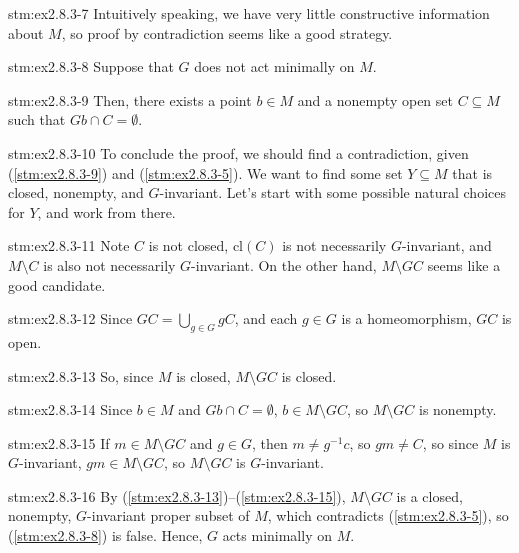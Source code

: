 \begin{explanation}{stm:ex2.8.3-7}
Intuitively speaking, we have very little constructive information about $M$, so proof by contradiction seems like a good strategy.
\end{explanation}

\begin{statement}{stm:ex2.8.3-8}
Suppose that $G$ does not act minimally on $M$.
\end{statement}

\begin{statement}{stm:ex2.8.3-9}
Then, there exists a point $b \in M$ and a nonempty open set $C \subseteq M$ such that $Gb \cap C = \emptyset$.
\end{statement}

\begin{explanation}{stm:ex2.8.3-10}
To conclude the proof, we should find a contradiction, given (\ref{stm:ex2.8.3-9}) and (\ref{stm:ex2.8.3-5}). We want to find some set $Y \subseteq M$ that is closed, nonempty, and $G$-invariant. Let's start with some possible natural choices for $Y$, and work from there.
\end{explanation}

\begin{explanation}{stm:ex2.8.3-11}
Note $C$ is not closed, $\text{cl}(C)$ is not necessarily $G$-invariant, and $M \setminus C$ is also not necessarily $G$-invariant. On the other hand, $M \setminus GC$ seems like a good candidate.
\end{explanation}

\begin{statement}{stm:ex2.8.3-12}
Since $GC = \bigcup_{g \in G} gC$, and each $g \in G$ is a homeomorphism, $GC$ is open.
\end{statement}

\begin{statement}{stm:ex2.8.3-13}
So, since $M$ is closed, $M \setminus GC$ is closed.
\end{statement}

\begin{statement}{stm:ex2.8.3-14}
Since $b \in M$ and $Gb \cap C = \emptyset$, $b \in M \setminus GC$, so $M \setminus GC$ is nonempty.
\end{statement}

\begin{statement}{stm:ex2.8.3-15}
If $m \in M \setminus GC$ and $g \in G$, then $m \ne g^{-1}c$, so $gm \ne C$, so since $M$ is $G$-invariant, $gm \in M \setminus GC$, so $M \setminus GC$ is $G$-invariant.
\end{statement}

\begin{statement}{stm:ex2.8.3-16}
By (\ref{stm:ex2.8.3-13})–(\ref{stm:ex2.8.3-15}), $M \setminus GC$ is a closed, nonempty, $G$-invariant proper subset of $M$, which contradicts (\ref{stm:ex2.8.3-5}), so (\ref{stm:ex2.8.3-8}) is false. Hence, $G$ acts minimally on $M$.
\end{statement}